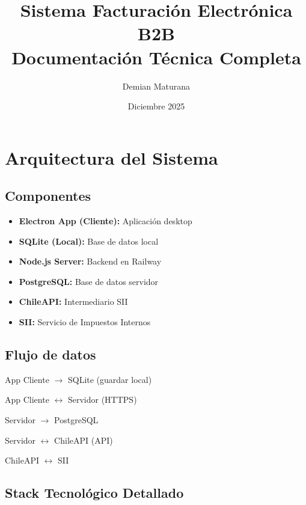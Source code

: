 \documentclass[11pt,a4paper]{article}
\title{\textbf{Sistema Facturación Electrónica B2B}\\Documentación Técnica Completa}
\author{Demian Maturana}
\date{Diciembre 2025}
\begin{document}
\maketitle
\newpage

\section{Arquitectura del Sistema}

\subsection{Componentes}

\begin{itemize}
    \item \textbf{Electron App (Cliente):} Aplicación desktop
    \item \textbf{SQLite (Local):} Base de datos local
    \item \textbf{Node.js Server:} Backend en Railway
    \item \textbf{PostgreSQL:} Base de datos servidor
    \item \textbf{ChileAPI:} Intermediario SII
    \item \textbf{SII:} Servicio de Impuestos Internos
\end{itemize}

\subsection{Flujo de datos}

App Cliente $\rightarrow$ SQLite (guardar local)

App Cliente $\leftrightarrow$ Servidor (HTTPS)

Servidor $\rightarrow$ PostgreSQL

Servidor $\leftrightarrow$ ChileAPI (API)

ChileAPI $\leftrightarrow$ SII

\subsection{Stack Tecnológico Detallado}
\end{document}
